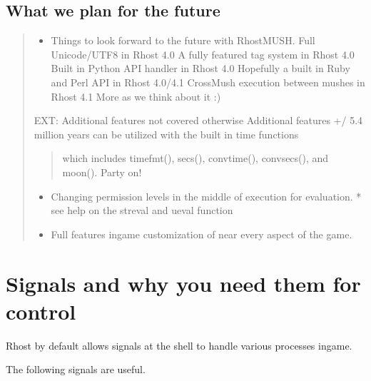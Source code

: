\documentclass[letterpaper,10pt,english]{sphinxmanual}
\begin{document}
\section{What we plan for the future}
\label{\detokenize{12-advanced:what-we-plan-for-the-future}}\begin{quote}
\begin{itemize}
\item {} 
\sphinxAtStartPar
Things to look forward to the future with RhostMUSH.
\sphinxhyphen{} Full Unicode/UTF8 in Rhost 4.0
\sphinxhyphen{} A fully featured tag system in Rhost 4.0
\sphinxhyphen{} Built in Python API handler in Rhost 4.0
\sphinxhyphen{} Hopefully a built in Ruby and Perl API in Rhost 4.0/4.1
\sphinxhyphen{} Cross\sphinxhyphen{}Mush execution between mushes in Rhost 4.1
\sphinxhyphen{} More as we think about it :)

\end{itemize}

\sphinxAtStartPar
EXT: Additional features not covered otherwise
Additional features
\sphinxhyphen{} +/\sphinxhyphen{} 5.4 million years can be utilized with the built in time functions
\begin{quote}

\sphinxAtStartPar
which includes timefmt(), secs(), convtime(), convsecs(), and moon().  Party on!
\end{quote}
\begin{itemize}
\item {} 
\sphinxAtStartPar
Changing permission levels in the middle of execution for evaluation.
* see help on the streval and ueval function

\item {} 
\sphinxAtStartPar
Full features in\sphinxhyphen{}game customization of near every aspect of the game.

\end{itemize}
\end{quote}


\chapter{Signals and why you need them for control}
\label{\detokenize{13-signals:signals-and-why-you-need-them-for-control}}\label{\detokenize{13-signals::doc}}
\sphinxAtStartPar
Rhost by default allows signals at the shell to handle various processes in\sphinxhyphen{}game.

\sphinxAtStartPar
The following signals are useful.
\end{document}
